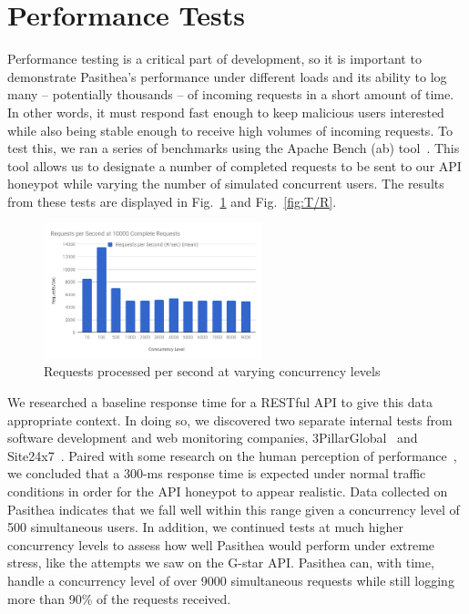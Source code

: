 
\section{Performance Tests} \label{performance}

Performance testing is a critical part of development, so it is important to demonstrate Pasithea's performance under different loads and its ability to log many -- potentially thousands -- of incoming requests in a short amount of time. 
In other words, it must respond fast enough to keep malicious users interested while also being stable enough to receive high volumes of incoming requests. 
To test this, we ran a series of benchmarks using the Apache Bench (ab) tool~\cite{ab}. 
This tool allows us to designate a number of completed requests to be sent to our API honeypot while varying the number of simulated concurrent users. 
The results from these tests are displayed in Fig.~\ref{fig:R/s} and Fig.~\ref{fig:T/R}. 

\begin{figure}[b]
   \centering
   \includegraphics[width=2.5in]{images/RequestsperSecond.png} 
   \caption{Requests processed per second at varying concurrency levels}
   \label{fig:R/s}
\end{figure}

We researched a baseline response time for a RESTful API to give this data appropriate context. 
In doing so, we discovered two separate internal tests from software development and web monitoring companies, 3PillarGlobal~\cite{3Pillar} and Site24x7~\cite{site24x7}. 
Paired with some research on the human perception of performance~\cite{performance}, we concluded that a 300-ms response time is expected under normal traffic conditions in order for the API honeypot to appear realistic. 
Data collected on Pasithea indicates that we fall well within this range given a concurrency level of 500 simultaneous users. 
In addition, we continued tests at much higher concurrency levels to assess how well Pasithea would perform under extreme stress, like the attempts we saw on the G-star API. 
Pasithea can, with time, handle a concurrency level of over 9000 simultaneous requests while still logging more than 90\% of the requests received.

